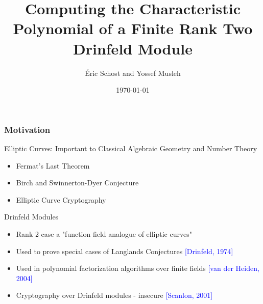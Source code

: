 \documentclass{beamer}
\title[]{Computing the Characteristic Polynomial of a Finite Rank Two Drinfeld Module} %
\author{\'Eric Schost and Yossef Musleh} %
\institute[UW] %
{
University of Waterloo \\ %
\medskip
\textit{ISSAC 2019 \\ Beihang University \\ Beijing, People's Republic of China} %
}
\date{\today} %
\newcommand{\blue}{\textcolor{blue}}
\begin{document}
\begin{frame}
\titlepage %
\end{frame}



\begin{frame}
\frametitle{Motivation}



  Elliptic Curves: Important to Classical Algebraic Geometry and Number Theory
\begin{itemize}
 \item     Fermat's Last Theorem
\item Birch and Swinnerton-Dyer Conjecture
 \item Elliptic Curve Cryptography
 \end{itemize}
    

 Drinfeld Modules

\begin{itemize}

\item Rank 2 case a "function field analogue of elliptic curves"
  \item Used to prove special cases of Langlands Conjectures \textcolor{blue}{[Drinfeld, 1974]}
   \item  Used in polynomial factorization algorithms over finite fields \blue{[van der Heiden, 2004]}
    
 
     \item Cryptography over Drinfeld modules - insecure \blue{[Scanlon, 2001]}
     \end{itemize}
  
  
  

\end{frame}
\end{document}
